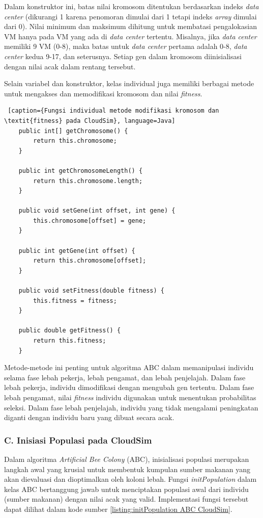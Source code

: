 Dalam konstruktor ini, batas nilai kromosom ditentukan berdasarkan indeks \textit{data center} (dikurangi 1 karena penomoran dimulai dari 1 tetapi indeks \textit{array} dimulai dari 0). Nilai minimum dan maksimum dihitung untuk membatasi pengalokasian VM hanya pada VM yang ada di \textit{data center} tertentu. Misalnya, jika \textit{data center} memiliki 9 VM (0-8), maka batas untuk \textit{data center} pertama adalah 0-8, \textit{data center} kedua 9-17, dan seterusnya. Setiap gen dalam kromosom diinisialisasi dengan nilai acak dalam rentang tersebut.

Selain variabel dan konstruktor, kelas individual juga memiliki berbagai metode untuk mengakses dan memodifikasi kromosom dan nilai \textit{fitness}.

\begin{lstlisting} [caption={Fungsi individual metode modifikasi kromosom dan \textit{fitness} pada CloudSim}, language=Java]
    public int[] getChromosome() {
        return this.chromosome;
    }

    public int getChromosomeLength() {
        return this.chromosome.length;
    }

    public void setGene(int offset, int gene) {
        this.chromosome[offset] = gene;
    }

    public int getGene(int offset) {
        return this.chromosome[offset];
    }

    public void setFitness(double fitness) {
        this.fitness = fitness;
    }

    public double getFitness() {
        return this.fitness;
    }
\end{lstlisting}

Metode-metode ini penting untuk algoritma ABC dalam memanipulasi individu selama fase lebah pekerja, lebah pengamat, dan lebah penjelajah. Dalam fase lebah pekerja, individu dimodifikasi dengan mengubah gen tertentu. Dalam fase lebah pengamat, nilai \textit{fitness} individu digunakan untuk menentukan probabilitas seleksi. Dalam fase lebah penjelajah, individu yang tidak mengalami peningkatan diganti dengan individu baru yang dibuat secara acak.

\subsubsection{C. Inisiasi Populasi pada CloudSim}
Dalam algoritma \textit{Artificial Bee Colony} (ABC), inisialisasi populasi merupakan langkah awal yang krusial untuk membentuk kumpulan sumber makanan yang akan dievaluasi dan dioptimalkan oleh koloni lebah. Fungsi \textit{initPopulation} dalam kelas ABC bertanggung jawab untuk menciptakan populasi awal dari individu (sumber makanan) dengan nilai acak yang valid. Implementasi fungsi tersebut dapat dilihat dalam kode sumber \ref{listing:initPopulation ABC CloudSim}.

